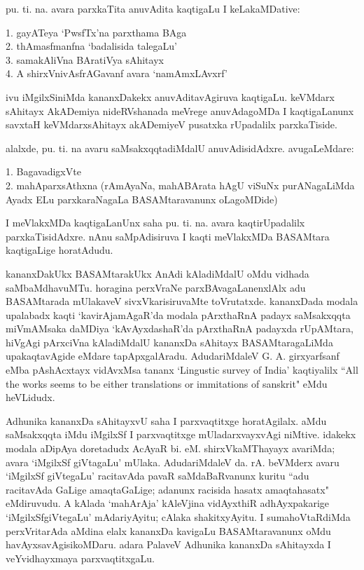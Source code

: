 pu. ti. na. avara parxkaTita anuvAdita kaqtigaLu I keLakaMDative:

1. gayATeya `PwsfTx'na parxthama BAga\\
2. thAmasfmanfna `badalisida talegaLu'\\
3. samakAliVna BAratiVya sAhitayx\\
4. A shirxVnivAsfrAGavanf avara `namAmxLAvxrf'

ivu iMgilxSiniMda kananxDakekx anuvAditavAgiruva kaqtigaLu. keVMdarx sAhitayx AkADemiya nideRVshanada meVrege anuvAdagoMDa I kaqtigaLanunx savxtaH keVMdarxsAhitayx akADemiyeV pusatxka rUpadalilx parxkaTiside.

alalxde, pu. ti. na avaru saMsakxqqtadiMdalU anuvAdisidAdxre. avugaLeMdare:

1. BagavadigxVte\\
2. mahAparxsAthxna (rAmAyaNa, mahABArata hAgU viSuNx purANagaLiMda Ayadx ELu parxkaraNagaLa BASAMtaravanunx oLagoMDide)

I meVlakxMDa kaqtigaLanUnx saha pu. ti. na. avara kaqtirUpadalilx parxkaTisidAdxre. nAnu saMpAdisiruva I kaqti meVlakxMDa BASAMtara kaqtigaLige horatAdudu.

kananxDakUkx BASAMtarakUkx AnAdi kAladiMdalU oMdu vidhada saMbaMdhavuMTu. horagina perxVraNe parxBAvagaLanenxlAlx adu BASAMtarada mUlakaveV sivxVkarisiruvaMte toVrutatxde. kananxDada modala upalabadx kaqti `kavirAjamAgaR'da modala pArxthaRnA padayx saMsakxqqta miVmAMsaka daMDiya `kAvAyxdashaR'da pArxthaRnA padayxda rUpAMtara, hiVgAgi pArxciVna kAladiMdalU kananxDa sAhitayx BASAMtaragaLiMda upakaqtavAgide eMdare tapApxgalAradu. AdudariMdaleV {\rm G. A.} girxyarfsanf eMba pAshAcxtayx vidAvxMsa tananx {\rm `Lingustic survey of India'} kaqtiyalilx {\rm ``All the works seems to be either translations or immitations of sanskrit"} eMdu heVLidudx.

Adhunika kananxDa sAhitayxvU saha I parxvaqtitxge horatAgilalx. aMdu saMsakxqqta iMdu iMgilxSf I parxvaqtitxge mUladarxvayxvAgi niMtive. idakekx modala aDipAya doretadudx AcAyaR bi. eM. shirxVkaMThayayx avariMda; avara `iMgilxSf giVtagaLu' mUlaka. AdudariMdaleV da. rA. beVMderx avaru `iMgilxSf giVtegaLu' racitavAda pavaR saMdaBaRvanunx kuritu ``adu racitavAda  GaLige amaqtaGaLige; adanunx racisida hasatx amaqtahasatx" eMdiruvudu. A kAlada `mahArAja' kAleVjina vidAyxthiR adhAyxpakarige `iMgilxSfgiVtegaLu' mAdariyAyitu; cAlaka shakitxyAyitu. I sumahoVtaRdiMda perxVritarAda aMdina elalx kananxDa kavigaLu BASAMtaravanunx oMdu havAyxsavAgisikoMDaru. adara PalaveV Adhunika kananxDa sAhitayxda I veYvidhayxmaya parxvaqtitxgaLu.

